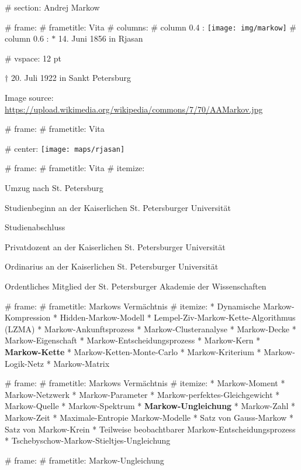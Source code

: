 # section: Andrej Markow

# frame:
  # frametitle: Vita
  # columns:
    # column {0.4 \textwidth}:
      \texttt{[image: img/markow]}
    # column {0.6 \textwidth}:
      $*$ 14. Juni 1856 in Rjasan

      # vspace: 12 pt

      $\dagger$ 20. Juli 1922 in Sankt Petersburg

  \color{mDarkTeal!40!white}
  \tiny{Image source: \url{https://upload.wikimedia.org/wikipedia/commons/7/70/AAMarkov.jpg}}

# frame:
  # frametitle: Vita

  # center:
    \texttt{[image: maps/rjasan]}

# frame:
  # frametitle: Vita
    # itemize:
      \item[1866 (10)] Umzug nach St. Petersburg
      \item[1874 (18)] Studienbeginn an der Kaiserlichen St. Petersburger Universität
      \item[1878 (22)] Studienabschluss
      \item[1880 (24)] Privatdozent an der Kaiserlichen St. Petersburger Universität
      \item[1886 (30)] Ordinarius an der Kaiserlichen St. Petersburger Universität
      \item[1896 (40)] Ordentliches Mitglied der St. Petersburger Akademie der Wissenschaften

# frame:
  # frametitle: Markows Vermächtnis
  # itemize:
    * Dynamische Markow-Kompression
    * Hidden-Markow-Modell
    * Lempel-Ziv-Markow-Kette-Algorithmus (LZMA)
    * Markow-Ankunftsprozess
    * Markow-Clusteranalyse
    * Markow-Decke
    * Markow-Eigenschaft
    * Markow-Entscheidungsprozess
    * Markow-Kern
    * \textbf{Markow-Kette}
    * Markow-Ketten-Monte-Carlo
    * Markow-Kriterium
    * Markow-Logik-Netz
    * Markow-Matrix

# frame:
  # frametitle: Markows Vermächtnis
  # itemize:
    * Markow-Moment
    * Markow-Netzwerk
    * Markow-Parameter
    * Markow-perfektes-Gleichgewicht
    * Markow-Quelle
    * Markow-Spektrum
    * \textbf{Markow-Ungleichung}
    * Markow-Zahl
    * Markow-Zeit
    * Maximale-Entropie Markow-Modelle
    * Satz von Gauss-Markow
    * Satz von Markow-Krein
    * Teilweise beobachtbarer Markow-Entscheidungsprozess
    * Tschebyschow-Markow-Stieltjes-Ungleichung

# frame:
  # frametitle: Markow-Ungleichung

